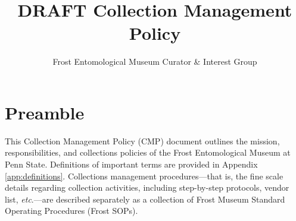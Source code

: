 \documentclass[letterpaper, 11pt]{article}
\title{\textbf{DRAFT} Collection Management Policy}
\author{Frost Entomological Museum Curator \& Interest Group}
\begin{document}
\cleanlookdateon %
\maketitle
\thispagestyle{fancy}

\section*{Preamble}
This Collection Management Policy (CMP) document outlines the mission, responsibilities, and collections policies of the Frost Entomological Museum at Penn State. Definitions of important terms are provided in Appendix \ref{app:definitions}. Collections management procedures---that is, the fine scale details regarding collection activities, including step-by-step protocols, vendor list, \textit{etc}.---are described separately as a collection of Frost Museum Standard Operating Procedures (Frost SOPs).\\
\end{document}
